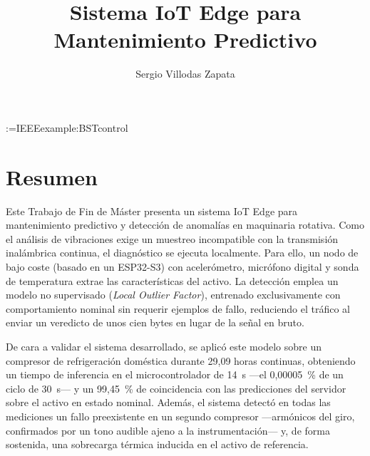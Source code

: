 \documentclass[%
    paper=A4,               %
    twoside,                %
    parskip=full,           %
    12pt,                   %
    titlepage=on,           %
    captions=tableabove,    %
]{book}
\title{Sistema IoT Edge para Mantenimiento Predictivo}
\author{Sergio Villodas Zapata}
\begin{document}
\makeatletter
\providecommand{\bstctlcite}[1]{\@bsphack
  \@for\@citeb:=#1\do{\edef\@citeb{\expandafter\@firstofone\@citeb}%
    \if@filesw\immediate\write\@auxout{\string\citation{\@citeb}}\fi}%
  \@esphack}
\makeatother
\bstctlcite{IEEEexample:BSTcontrol}


\maketitle
\clearemptydoublepage


\thispagestyle{plain}
\section*{Resumen}
Este Trabajo de Fin de Máster presenta un sistema IoT Edge para mantenimiento predictivo y
detección de anomalías en maquinaria rotativa. Como el análisis de vibraciones exige un muestreo
incompatible con la transmisión inalámbrica continua, el diagnóstico se ejecuta localmente. Para
ello, un nodo de bajo coste (basado en un ESP32-S3) con acelerómetro, micrófono digital y sonda de
temperatura extrae las características del activo. La detección emplea un modelo no supervisado (\textit{Local Outlier
Factor}), entrenado exclusivamente con comportamiento nominal sin requerir ejemplos de fallo,
reduciendo el tráfico al enviar un veredicto de unos cien bytes en lugar de la señal en bruto.

De cara a validar el sistema desarrollado, se aplicó este modelo sobre un compresor de refrigeración doméstica
durante \mbox{29,09} horas continuas, obteniendo un tiempo de inferencia en el microcontrolador de
\mbox{14 \textmu s} —el \mbox{0,00005 \%} de un ciclo de \mbox{30 s}— y un \mbox{99,45 \%} de
coincidencia con las predicciones del servidor sobre el activo en estado nominal. Además, el sistema detectó en todas las mediciones un fallo
preexistente en un segundo compresor —armónicos del giro, confirmados por un tono audible ajeno a
la instrumentación— y, de forma sostenida, una sobrecarga térmica inducida en el activo de
referencia.
\end{document}
